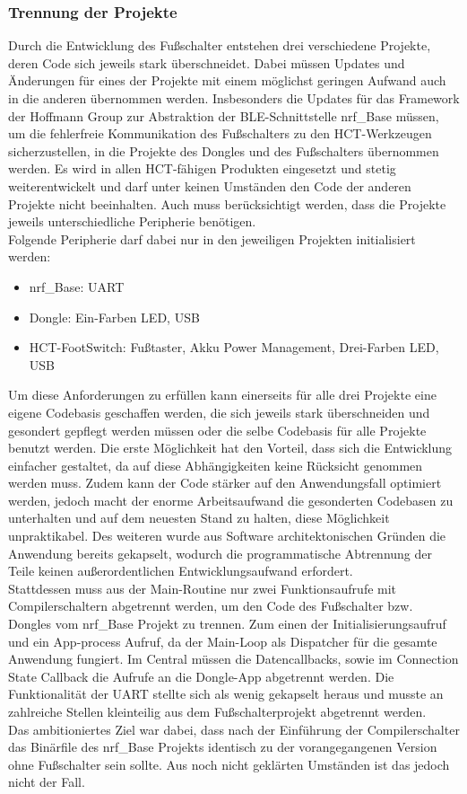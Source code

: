 \subsubsection{Trennung der Projekte}
Durch die Entwicklung des Fußschalter entstehen drei verschiedene Projekte, deren Code sich jeweils stark überschneidet. Dabei müssen Updates und Änderungen für eines der Projekte mit einem möglichst geringen Aufwand auch in die anderen übernommen werden. Insbesonders die Updates für das Framework der Hoffmann Group zur Abstraktion der \ac{BLE}-Schnittstelle nrf\_Base müssen, um die fehlerfreie Kommunikation des Fußschalters zu den \ac{HCT}-Werkzeugen sicherzustellen, in die Projekte des Dongles und des Fußschalters übernommen werden. Es wird in allen \ac{HCT}-fähigen Produkten eingesetzt und stetig weiterentwickelt und darf unter keinen Umständen den Code der anderen Projekte nicht beeinhalten. Auch muss berücksichtigt werden, dass die Projekte jeweils unterschiedliche Peripherie benötigen.\\
Folgende Peripherie darf dabei nur in den jeweiligen Projekten initialisiert werden:
\begin{itemize}
	\item nrf\_Base: \ac{UART}
	\item Dongle: Ein-Farben LED, \ac{USB}
	\item \ac{HCT}-FootSwitch: Fußtaster, Akku Power Management, Drei-Farben LED, \ac{USB}
\end{itemize}

Um diese Anforderungen zu erfüllen kann einerseits für alle drei Projekte eine eigene Codebasis geschaffen werden, die sich jeweils stark überschneiden und gesondert gepflegt werden müssen oder die selbe Codebasis für alle Projekte benutzt werden. Die erste Möglichkeit hat den Vorteil, dass sich die Entwicklung einfacher gestaltet, da auf diese Abhängigkeiten keine Rücksicht genommen werden muss. Zudem kann der Code stärker auf den Anwendungsfall optimiert werden, jedoch macht der enorme Arbeitsaufwand die gesonderten Codebasen zu unterhalten und auf dem neuesten Stand zu halten, diese Möglichkeit unpraktikabel. Des weiteren wurde aus Software architektonischen Gründen die Anwendung bereits gekapselt, wodurch die programmatische Abtrennung der Teile keinen außerordentlichen Entwicklungsaufwand erfordert.\\
Stattdessen muss aus der Main-Routine nur zwei Funktionsaufrufe mit Compilerschaltern abgetrennt werden, um den Code des Fußschalter bzw. Dongles vom nrf\_Base Projekt zu trennen. Zum einen der Initialisierungsaufruf und ein App-process Aufruf, da der Main-Loop als Dispatcher für die gesamte Anwendung fungiert. Im Central müssen die Datencallbacks, sowie im Connection State Callback die Aufrufe an die Dongle-App abgetrennt werden. Die Funktionalität der \ac{UART} stellte sich als wenig gekapselt heraus und musste an zahlreiche Stellen kleinteilig aus dem Fußschalterprojekt abgetrennt werden.\\ 
Das ambitioniertes Ziel war dabei, dass nach der Einführung der Compilerschalter das Binärfile des nrf\_Base Projekts identisch zu der vorangegangenen Version ohne Fußschalter sein sollte. Aus noch nicht geklärten Umständen ist das jedoch nicht der Fall.


